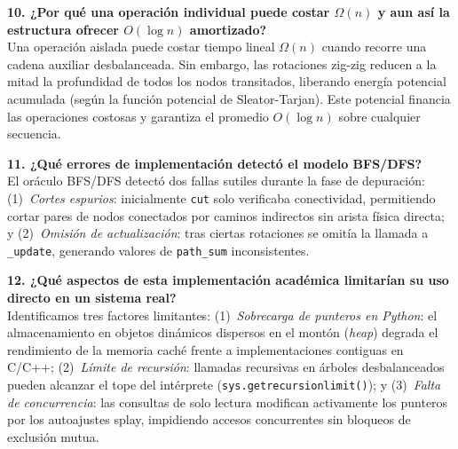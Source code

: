 \smallskip
\noindent\textbf{10. ¿Por qué una operación individual puede costar $\Omega(n)$ y aun así la estructura ofrecer $O(\log n)$ amortizado?}\\
Una operación aislada puede costar tiempo lineal $\Omega(n)$ cuando recorre una cadena auxiliar desbalanceada. Sin embargo, las rotaciones zig-zig reducen a la mitad la profundidad de todos los nodos transitados, liberando energía potencial acumulada (según la función potencial de Sleator-Tarjan). Este potencial financia las operaciones costosas y garantiza el promedio $O(\log n)$ sobre cualquier secuencia.

\smallskip
\noindent\textbf{11. ¿Qué errores de implementación detectó el modelo BFS/DFS?}\\
El oráculo BFS/DFS detectó dos fallas sutiles durante la fase de depuración: (1)~\textit{Cortes espurios}: inicialmente \texttt{cut} solo verificaba conectividad, permitiendo cortar pares de nodos conectados por caminos indirectos sin arista física directa; y (2)~\textit{Omisión de actualización}: tras ciertas rotaciones se omitía la llamada a \texttt{\_update}, generando valores de \texttt{path\_sum} inconsistentes.

\smallskip
\noindent\textbf{12. ¿Qué aspectos de esta implementación académica limitarían su uso directo en un sistema real?}\\
Identificamos tres factores limitantes: (1)~\textit{Sobrecarga de punteros en Python}: el almacenamiento en objetos dinámicos dispersos en el montón (\textit{heap}) degrada el rendimiento de la memoria caché frente a implementaciones contiguas en C/C++; (2)~\textit{Límite de recursión}: llamadas recursivas en árboles desbalanceados pueden alcanzar el tope del intérprete (\texttt{sys.getrecursionlimit()}); y (3)~\textit{Falta de concurrencia}: las consultas de solo lectura modifican activamente los punteros por los autoajustes splay, impidiendo accesos concurrentes sin bloqueos de exclusión mutua.
